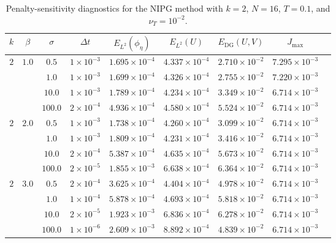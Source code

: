 \documentclass[pdflatex,sn-mathphys-num]{sn-jnl}%
\theoremstyle{thmstyleone}%
\theoremstyle{thmstyletwo}%
\theoremstyle{thmstylethree}%
\begin{document}
\begin{table}[htbp]
\centering
\caption{Penalty-sensitivity diagnostics for the NIPG method with $k=2$, $N=16$, $T=0.1$, and $\nu_T=10^{-2}$.}
\label{tab4}
\small
\begin{tabular}{ccccccccc}
\toprule
$k$ & $\beta$ & $\sigma$ &  $\Delta t$&$E_{L^2}(\phi_\eta)$ & $E_{L^2}(U)$ & $E_{\mathrm{DG}}(U,V)$ & $J_{\max}$ \\
\midrule
$2$ & $1.0$ & $0.5$ &  $1 \times 10^{-3}$ &$1.695\times 10^{-4}$ & $4.337 \times 10^{-4}$ & $2.710\times 10^{-2}$ & $7.295\times 10^{-3}$ \\
 & & $1.0$ &  $1 \times 10^{-3}$ & $1.699\times 10^{-4}$ & $4.326 \times 10^{-4}$ & $2.755 \times 10^{-2}$ & $7.220\times 10^{-3}$  \\
 & & $10.0$ &  $1 \times 10^{-3}$ &$1.789\times 10^{-4}$ & $4.234 \times 10^{-4}$ & $3.349\times 10^{-2}$ & $6.714\times 10^{-3}$ \\
 &  & $100.0$ &  $2 \times 10^{-4}$ &$4.936\times 10^{-4}$ & $4.580 \times 10^{-4}$ & $5.524\times 10^{-2}$ & $6.714\times 10^{-3}$ \\
 $2$ & $2.0$ & $0.5$ &  $1 \times 10^{-3}$ &$1.738\times 10^{-4}$ & $4.260 \times 10^{-4}$ & $3.099\times 10^{-2}$ & $6.714\times 10^{-3}$ \\
 & & $1.0$ &  $1 \times 10^{-3}$ &$1.809\times 10^{-4}$ & $4.231 \times 10^{-4}$ & $3.416\times 10^{-2}$ & $6.714\times 10^{-3}$ \\
 &  & $10.0$ &  $2 \times 10^{-4}$ &$5.387\times 10^{-4}$ & $4.635 \times 10^{-4}$ & $5.673\times 10^{-2}$ & $6.714\times 10^{-3}$ \\
 &  & $100.0$ &  $2 \times 10^{-5}$ &$1.855\times 10^{-3}$ & $6.638 \times 10^{-4}$ & $6.364\times 10^{-2}$ & $6.714\times 10^{-3}$ \\
 $2$ & $3.0$ & $0.5$ &  $2 \times 10^{-4}$ &$3.625\times 10^{-4}$ & $4.404 \times 10^{-4}$ & $4.978\times 10^{-2}$ & $6.714\times 10^{-3}$\\
 &  & $1.0$ &  $1 \times 10^{-4}$ & $5.878\times 10^{-4}$ & $4.693 \times 10^{-4}$ & $5.818\times 10^{-2}$ & $6.714 \times 10^{-3}$ \\
 &  & $10.0$ &  $2 \times 10^{-5}$ & $1.923\times 10^{-3}$ & $6.836 \times 10^{-4}$ & $6.278\times 10^{-2}$ & $6.714\times 10^{-3}$ \\
 & & $100.0$ &  $1 \times 10^{-6}$ &$2.609\times 10^{-3}$ & $8.892 \times 10^{-4}$ & $4.839\times 10^{-2}$ & $6.714\times 10^{-3}$ \\
\bottomrule
\end{tabular}
\end{table}
\end{document}
